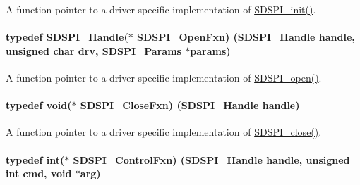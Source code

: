 A function pointer to a driver specific implementation of \hyperlink{_s_d_s_p_i_8h_a83cfcebe7875d9d8b5e08e57e6785ae6}{S\+D\+S\+P\+I\+\_\+init()}. 

\paragraph[{S\+D\+S\+P\+I\+\_\+\+Open\+Fxn}]{\setlength{\rightskip}{0pt plus 5cm}typedef {\bf S\+D\+S\+P\+I\+\_\+\+Handle}($\ast$ S\+D\+S\+P\+I\+\_\+\+Open\+Fxn) ({\bf S\+D\+S\+P\+I\+\_\+\+Handle} handle, unsigned char drv, {\bf S\+D\+S\+P\+I\+\_\+\+Params} $\ast$params)}\label{_s_d_s_p_i_8h_ad5e9c96037fb86b0337f0183dec6457d}


A function pointer to a driver specific implementation of \hyperlink{_s_d_s_p_i_8h_af4a5ca9bb35e8a7df02acf20ceeae66d}{S\+D\+S\+P\+I\+\_\+open()}. 

\paragraph[{S\+D\+S\+P\+I\+\_\+\+Close\+Fxn}]{\setlength{\rightskip}{0pt plus 5cm}typedef void($\ast$ S\+D\+S\+P\+I\+\_\+\+Close\+Fxn) ({\bf S\+D\+S\+P\+I\+\_\+\+Handle} handle)}\label{_s_d_s_p_i_8h_a93cc6dafba2c319c8f2662c9e109f0cd}


A function pointer to a driver specific implementation of \hyperlink{_s_d_s_p_i_8h_a8816c223935b575f10acd5277b9a8ca5}{S\+D\+S\+P\+I\+\_\+close()}. 

\paragraph[{S\+D\+S\+P\+I\+\_\+\+Control\+Fxn}]{\setlength{\rightskip}{0pt plus 5cm}typedef int($\ast$ S\+D\+S\+P\+I\+\_\+\+Control\+Fxn) ({\bf S\+D\+S\+P\+I\+\_\+\+Handle} handle, unsigned int cmd, void $\ast$arg)}\label{_s_d_s_p_i_8h_a0fe214b1dedf57fb70d9c83426a4b135}



